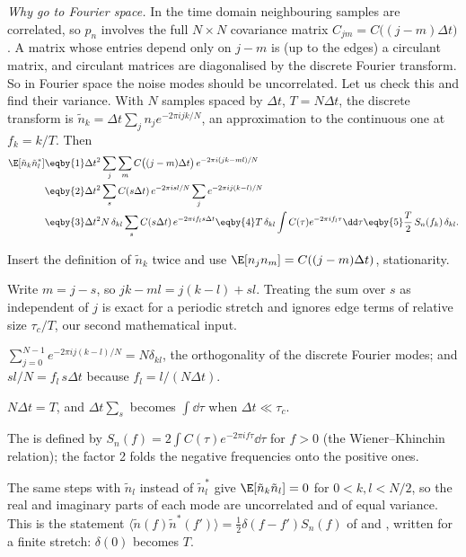 \emph{Why go to Fourier space.} In the time domain neighbouring samples are correlated, so $p_n$ involves the full
$N\times N$ covariance matrix $C_{jm}=C\big((j-m)\Delta t\big)$. A matrix whose entries depend only on $j-m$ is
(up to the edges) a circulant matrix, and circulant matrices are diagonalised by the discrete Fourier transform.
So in Fourier space the noise modes should be uncorrelated. Let us check this and find their variance. With
$N$ samples spaced by $\Delta t$, $T=N\Delta t$, the discrete transform is
$\tilde n_k=\Delta t\sum_j n_je^{-2\pi ijk/N}$, an approximation to the continuous one at $f_k=k/T$. Then
\begin{align}
  \E[\tilde n_k\tilde n_l^*]
  &\eqby{1}\Delta t^2\sum_j\sum_m C\big((j-m)\Delta t\big)\,e^{-2\pi i(jk-ml)/N}\nonumber\\
  &\eqby{2}\Delta t^2\sum_s C(s\Delta t)\,e^{-2\pi isl/N}\sum_j e^{-2\pi ij(k-l)/N}\nonumber\\
  &\eqby{3}\Delta t^2 N\,\delta_{kl}\sum_s C(s\Delta t)\,e^{-2\pi i f_l s\Delta t}
   \eqby{4}T\,\delta_{kl}\int C(\tau)e^{-2\pi if_l\tau}\dd\tau
   \eqby{5}\frac T2\,S_n(f_k)\,\delta_{kl}.
  \label{10b:eq:mode-variance}
\end{align}
\begin{explain}
  \item Insert the definition of $\tilde n_k$ twice and use $\E[n_jn_m]=C((j-m)\Delta t)$, stationarity.
  \item Write $m=j-s$, so $jk-ml=j(k-l)+sl$. Treating the sum over $s$ as independent of $j$ is exact for a
        periodic stretch and ignores edge terms of relative size $\tau_c/T$, our second mathematical input.
  \item $\sum_{j=0}^{N-1}e^{-2\pi ij(k-l)/N}=N\delta_{kl}$, the orthogonality of the discrete Fourier modes; and
        $sl/N=f_l\,s\Delta t$ because $f_l=l/(N\Delta t)$.
  \item $N\Delta t=T$, and $\Delta t\sum_s$ becomes $\int\dd\tau$ when $\Delta t\ll\tau_c$.
  \item The  is defined by $S_n(f)=2\int C(\tau)e^{-2\pi if\tau}\dd\tau$ for
        $f>0$ (the Wiener--Khinchin relation); the factor 2 folds the negative frequencies onto the positive ones.
\end{explain}
The same steps with $\tilde n_l$ instead of $\tilde n_l^*$ give $\E[\tilde n_k\tilde n_l]=0$ for $0<k,l<N/2$, so the
real and imaginary parts of each mode are uncorrelated and of equal variance. This is the statement
$\langle\tilde n(f)\tilde n^*(f')\rangle=\tfrac12\delta(f-f')S_n(f)$ of \cite[eq.~(35)]{BarackCutler2004} and
\cite{CutlerFlanagan1994}, written for a finite stretch: $\delta(0)$ becomes $T$.

